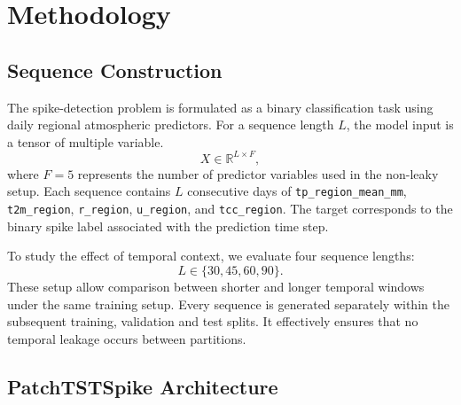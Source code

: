 \documentclass[runningheads]{llncs}
\begin{document}

\section{Methodology}

\subsection{Sequence Construction}

The spike-detection problem is formulated as a binary classification task using daily regional atmospheric predictors. For a sequence length $L$, the model input is a tensor of multiple variable.
\[
X \in \mathbb{R}^{L \times F},
\]
where $F=5$ represents the number of predictor variables used in the non-leaky setup. Each sequence contains $L$ consecutive days of \texttt{tp\_region\_mean\_mm}, \texttt{t2m\_region}, \texttt{r\_region}, \texttt{u\_region}, and \texttt{tcc\_region}. The target corresponds to the binary spike label associated with the prediction time step.

To study the effect of temporal context, we evaluate four sequence lengths:
\[
L \in \{30, 45, 60, 90\}.
\]
These setup allow comparison between shorter and longer temporal windows under the same training setup. Every sequence is generated separately within the subsequent training, validation and test splits. It effectively ensures that no temporal leakage occurs between partitions.

\subsection{PatchTSTSpike Architecture}
\end{document}
